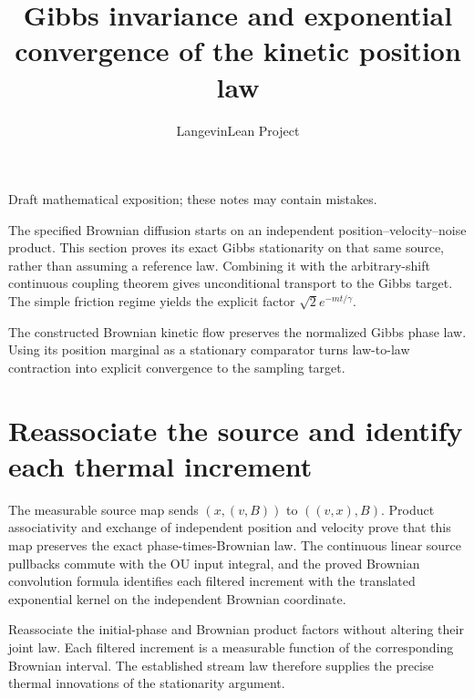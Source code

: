 \documentclass[11pt,a4paper]{article}
\title{\texorpdfstring{Gibbs invariance and exponential convergence of the kinetic position law}{Gibbs invariance and exponential convergence of the kinetic position law}}
\author{LangevinLean Project}
\date{}
\begin{document}
\maketitle
Draft mathematical exposition; these notes may contain mistakes.


The specified Brownian diffusion starts on an independent position–velocity–noise product. This section proves its exact Gibbs stationarity on that same source, rather than assuming a reference law. Combining it with the arbitrary-shift continuous coupling theorem gives unconditional transport to the Gibbs target. The simple friction regime yields the explicit factor \(\sqrt{2}e^{-mt/\gamma}\).



The constructed Brownian kinetic flow preserves the normalized Gibbs phase law. Using its position marginal as a stationary comparator turns law-to-law contraction into explicit convergence to the sampling target.


\section{\texorpdfstring{Reassociate the source and identify each thermal increment}{Reassociate the source and identify each thermal increment}}


The measurable source map sends \((x,(v,B))\) to \(((v,x),B)\). Product associativity and exchange of independent position and velocity prove that this map preserves the exact phase-times-Brownian law. The continuous linear source pullbacks commute with the OU input integral, and the proved Brownian convolution formula identifies each filtered increment with the translated exponential kernel on the independent Brownian coordinate.



Reassociate the initial-phase and Brownian product factors without altering their joint law. Each filtered increment is a measurable function of the corresponding Brownian interval. The established stream law therefore supplies the precise thermal innovations of the stationarity argument.
\end{document}
